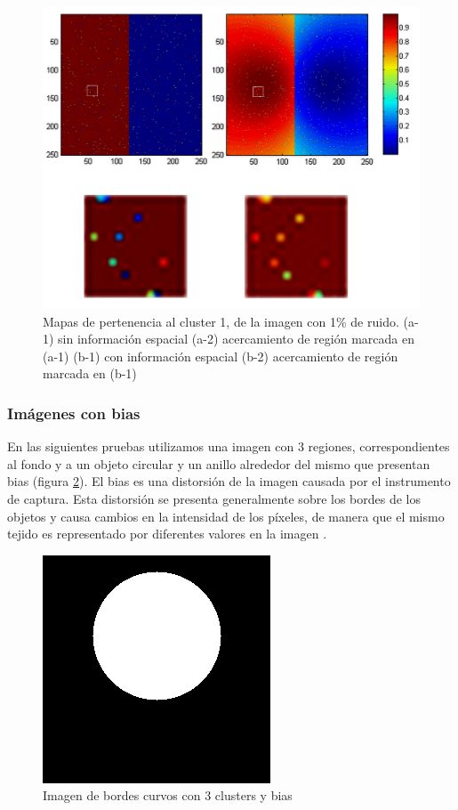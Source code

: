 \begin{figure}[H]
\centering
\includegraphics[scale=0.05]{images/mitad_mitad_ruido_zoom-fondo-blanco.jpg}
\caption{Mapas de pertenencia al cluster 1, de la imagen con 1\% de ruido. 
(a-1) sin información espacial (a-2) acercamiento de región marcada en (a-1)
(b-1) con información espacial (b-2) acercamiento de región marcada en (b-1)}
\label{fig:mitad_mitad_ruido_zoom}
\end{figure}

\subsubsection{Imágenes con bias}
En las siguientes pruebas utilizamos una imagen con 3 regiones, correspondientes al fondo y a un objeto circular y un anillo alrededor del mismo que presentan bias (figura \ref{fig:circulo_bias}). El bias es una distorsión de la imagen causada por el instrumento de captura. Esta distorsión se presenta generalmente sobre los bordes de los objetos y causa cambios en la intensidad de los píxeles, de manera que el mismo tejido es representado por diferentes valores en la imagen \citep{juntu2005bias}.

\begin{figure}[H]
\centering
\includegraphics[scale=0.3]{images/biasing.png}
\caption{Imagen de bordes curvos con 3 clusters y bias}
\label{fig:circulo_bias}
\end{figure}

